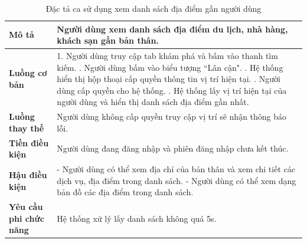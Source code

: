 \begin{longtable}{| p{4cm} | p{\dimexpr\linewidth-4cm-4\tabcolsep} |} %
    \caption{Đặc tả ca sử dụng xem danh sách địa điểm gần người dùng} %
    \label{tab:uc_nearby_places_spec} \\ %

    \hline
    \textbf{Mô tả} & Người dùng xem danh sách địa điểm du lịch, nhà hàng, khách sạn gần bản thân. \\
    \hline
    \endfirsthead %



    \hline %
    \endlastfoot

    \textbf{Luồng cơ bản} & 1. Người dùng truy cập tab khám phá và bấm vào thanh tìm kiếm. \newline
                           2. Người dùng bấm vào biểu tượng ``Lân cận". \newline
                           3. Hệ thống hiển thị hộp thoại cấp quyền thông tin vị trí hiện tại. \newline
                           4. Người dùng cấp quyền cho hệ thống. \newline
                           5. Hệ thống lấy vị trí hiện tại của người dùng và hiển thị danh sách địa điểm gần nhất. \\
    \hline
    \textbf{Luồng thay thế} & Người dùng không cấp quyền truy cập vị trí sẽ nhận thông báo lỗi. \\
    \hline
    \textbf{Tiền điều kiện} & Người dùng đang đăng nhập và phiên đăng nhập chưa kết thúc. \\
    \hline
    \textbf{Hậu điều kiện} & - Người dùng có thể xem địa chỉ của bản thân và xem chi tiết các dịch vụ, địa điểm trong danh sách. \newline
                           - Người dùng có thể xem dạng bản đồ các địa điểm trong danh sách. \\
    \hline
    \textbf{Yêu cầu phi chức năng} & Hệ thống xử lý lấy danh sách không quá 5s. \\

\end{longtable}
\vspace{0.8cm}

